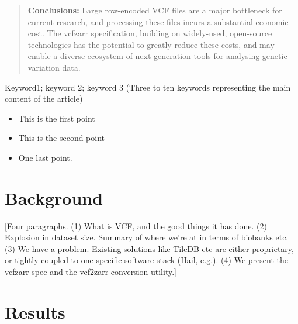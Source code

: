 \documentclass[a4paper,num-refs]{oup-contemporary}
\begin{document}
\begin{frontmatter}
\begin{abstract}
\textbf{Conclusions:}
Large row-encoded VCF files are a major bottleneck for current research, and 
processing these files incurs a substantial economic cost.
The vcfzarr specification, building on widely-used, open-source technologies
has the potential to greatly reduce these costs,
and may enable a diverse ecosystem of next-generation tools for analysing 
genetic variation data.
\end{abstract}

\begin{keywords}
Keyword1; keyword 2; keyword 3 (Three to ten keywords representing the main content of the article)
\end{keywords}
\end{frontmatter}

\begin{keypoints*}
\begin{itemize}
\item This is the first point
\item This is the second point
\item One last point.
\end{itemize}
\end{keypoints*}

\section{Background}
[Four paragraphs. (1) What is VCF, and the good things it has done. 
(2) Explosion in dataset size. Summary of where we're at in terms of biobanks
etc. (3) We have a problem. Existing solutions like TileDB etc
are either proprietary, or tightly coupled to one specific software stack
(Hail, e.g.).
(4) We present the vcfzarr spec and the vcf2zarr conversion utility.]

\section{Results}
\end{document}
